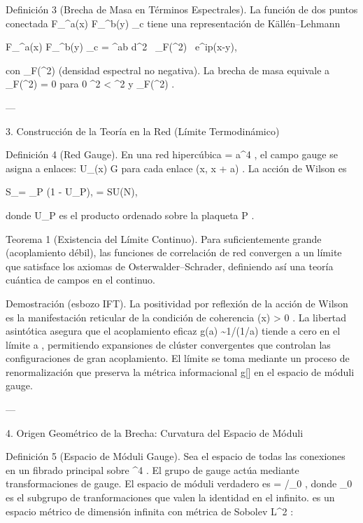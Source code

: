 \documentclass[12pt,twoside]{book}
\begin{document}
Definición 3 (Brecha de Masa en Términos Espectrales).
La función de dos puntos conectada  \langle F_{\mu\nu}^a(x) F_{\rho\sigma}^b(y) \rangle_c  tiene una representación de Källén–Lehmann

\langle F_{\mu\nu}^a(x) F_{\rho\sigma}^b(y) \rangle_c = \delta^{ab} \int d\mu^2 \, \rho_F(\mu^2) \int {} \,  e^{ip\cdot(x-y)},

con  \rho_F(\mu^2)   (densidad espectral no negativa). La brecha de masa equivale a  \rho_F(\mu^2) = 0  para  0 \le \mu^2 < \Delta^2  y  \rho_F(\Delta^2)  .

---

3. Construcción de la Teoría en la Red (Límite Termodinámico)

Definición 4 (Red Gauge).
En una red hipercúbica  \Lambda = a^4 , el campo gauge se asigna a enlaces:  U_\mu(x) \in G  para cada enlace  (x, x + a\hat{\mu}) . La acción de Wilson es

S_\Lambda[U] = \beta \sum_P  (1 - U_P), \quad \beta =   SU(N),

donde  U_P  es el producto ordenado sobre la plaqueta  P .

Teorema 1 (Existencia del Límite Continuo).
Para  \beta  suficientemente grande (acoplamiento débil), las funciones de correlación de red convergen a un límite que satisface los axiomas de Osterwalder–Schrader, definiendo así una teoría cuántica de campos en el continuo.

Demostración (esbozo IFT). La positividad por reflexión de la acción de Wilson es la manifestación reticular de la condición de coherencia  \rho(x) > 0 . La libertad asintótica asegura que el acoplamiento eficaz  g(a) \sim 1/\ln(1/a\Lambda)  tiende a cero en el límite  a  , permitiendo expansiones de clúster convergentes que controlan las configuraciones de gran acoplamiento. El límite se toma mediante un proceso de renormalización que preserva la métrica informacional  g[\rho]  en el espacio de móduli gauge.

---

4. Origen Geométrico de la Brecha: Curvatura del Espacio de Móduli

Definición 5 (Espacio de Móduli Gauge).
Sea    el espacio de todas las conexiones en un fibrado principal sobre  ^4 . El grupo de gauge    actúa mediante transformaciones de gauge. El espacio de móduli verdadero es   = /_0 , donde  _0  es el subgrupo de tranformaciones que valen la identidad en el infinito.    es un espacio métrico de dimensión infinita con métrica de Sobolev  L^2 :
\end{document}
